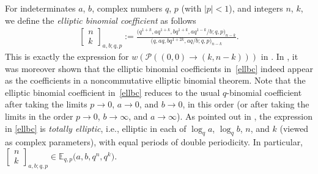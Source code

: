 \documentclass[10pt,a4paper]{amsart}
\numberwithin{equation}{section}
\theoremstyle{definition}
\newcommand{\E}{\mathbb E}
\begin{document}
For indeterminates $a$, $b$, complex numbers $q$, $p$
(with $|p|<1$), and integers $n$, $k$, we
define the {\em elliptic binomial coefficient} as follows
\begin{gather}\label{ellbc}
\begin{bmatrix}n\\k\end{bmatrix}_{a,b;q,p}:=
\frac{\bigl(q^{1+k},aq^{1+k},bq^{1+k},aq^{1-k}/b;q,p\bigr)_{n-k}}
{\bigl(q,aq,bq^{1+2k},aq/b;q,p\bigr)_{n-k}}.
\end{gather}
This is exactly the expression for $w(\mathcal P((0,0)\to(k,n-k)))$
in \cite[Theorem~2.1]{S}. In \cite{S1}, it was moreover shown that the
elliptic binomial coefficients in~\eqref{ellbc} indeed appear as the
coefficients in a noncommutative elliptic binomial theorem.
Note that the elliptic binomial coefficient
in~\eqref{ellbc} reduces to the usual $q$-binomial coefficient
after taking the limits $p\to 0$, $a\to 0$, and $b\to 0$,
in this order (or after taking the limits in the order $p\to 0$,
$b\to\infty$, and $a\to\infty$).
As pointed out in \cite{S}, the expression in
\eqref{ellbc} is {\em totally elliptic}, i.e.,
elliptic in each of $\log_qa$, $\log_qb$, $n$, and $k$
(viewed as complex parameters), with equal periods of double periodicity.
In particular,
$\left[\begin{smallmatrix}n\\k\end{smallmatrix}\right]_{a,b;q,p}
\in\E_{q,p}\bigl(a,b,q^n,q^k\bigr)$.
\end{document}
